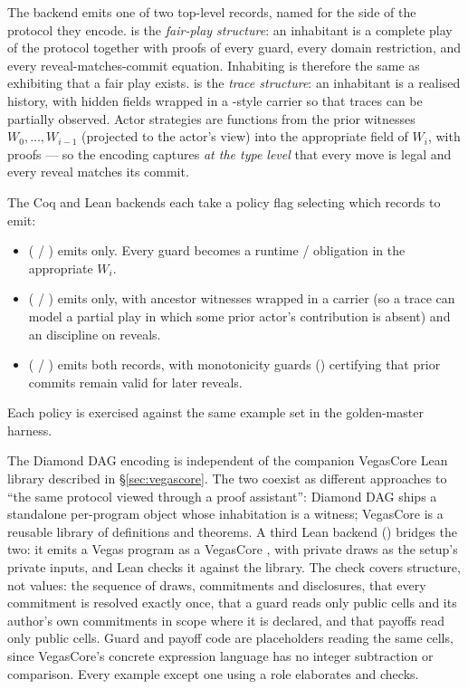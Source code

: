The backend emits one of two top-level records, named for the
side of the protocol they encode.   is the
\emph{fair-play structure}: an inhabitant is a complete play of
the protocol together with proofs of every guard, every domain
restriction, and every reveal-matches-commit equation.  Inhabiting
 is therefore the same as exhibiting that a fair
play exists.   is the \emph{trace structure}: an
inhabitant is a realised history, with hidden fields wrapped in a
-style carrier so that traces can be partially observed.
Actor strategies are functions from the prior witnesses
$W_0, \dots, W_{i-1}$ (projected to the actor's view) into the
appropriate field of $W_i$, with proofs --- so the encoding
captures \emph{at the type level} that every move is legal and
every reveal matches its commit.

The Coq and Lean backends each take a policy flag selecting which
records to emit:

\begin{itemize}\itemsep1pt
\item {} ( / ) emits
   only.  Every guard becomes a runtime
  / obligation in the appropriate $W_i$.
\item {} ( /
  ) emits  only, with
  ancestor witnesses wrapped in a  carrier (so a
  trace can model a partial play in which some prior actor's
  contribution is absent) and an  discipline on
  reveals.
\item {} ( / )
  emits both records, with monotonicity guards
  () certifying that prior commits
  remain valid for later reveals.
\end{itemize}

Each policy is exercised against the same example set in the
golden-master harness.

The Diamond DAG encoding is independent of the companion
VegasCore Lean library described in \S\ref{sec:vegascore}.  The
two coexist as different approaches to ``the same protocol viewed
through a proof assistant'': Diamond DAG ships a standalone
per-program object whose inhabitation is a witness; VegasCore is
a reusable library of definitions and theorems.  A third Lean
backend () bridges the two: it emits a Vegas program
as a VegasCore , with private draws as the
setup's private inputs, and Lean checks it against the library.
The check covers structure, not values: the sequence of draws,
commitments and disclosures, that every commitment is resolved
exactly once, that a guard reads only public cells and its
author's own commitments in scope where it is declared, and
that payoffs read only public cells.  Guard and payoff code are
placeholders reading the same cells, since VegasCore's concrete
expression language has no integer subtraction or comparison.
Every example except one using a  role elaborates and
checks.

